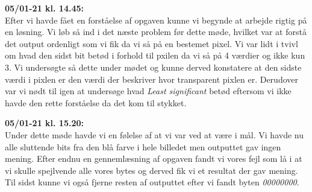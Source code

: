 \documentclass[10pt]{report}
\begin{document}
\noindent\textbf{05/01-21 kl. 14.45:}\\
\noindent Efter vi havde fået en forståelse af opgaven kunne vi begynde at arbejde rigtig på en løsning. Vi løb så ind i det næste problem før dette møde, hvilket var at forstå det output ordenligt som vi fik da vi så på en bestemet pixel. Vi var lidt i tvivl om hvad den sidst bit betød i forhold til pxilen da vi så på 4 værdier og ikke kun 3. Vi undersøgte så dette under mødet og kunne derved konstatere at den sidste værdi i pixlen er den værdi der beskriver hvor transparent pixlen er. Derudover var vi nødt til igen at undersøge hvad \textit{Least significant} betød eftersom vi ikke havde den rette forståelse da det kom til stykket.

\noindent\textbf{05/01-21 kl. 15.20:}\\
\noinden Under dette møde havde vi en følelse af at vi var ved at være i mål. Vi havde nu alle sluttende bits fra den blå farve i hele billedet men outputtet gav ingen mening. Efter endnu en gennemlæsning af opgaven fandt vi vores fejl som lå i at vi skulle spejlvende alle vores bytes og derved fik vi et resultat der gav mening. Til sidst kunne vi også fjerne resten af outputtet efter vi fandt byten \textit{00000000}.
\end{document}
